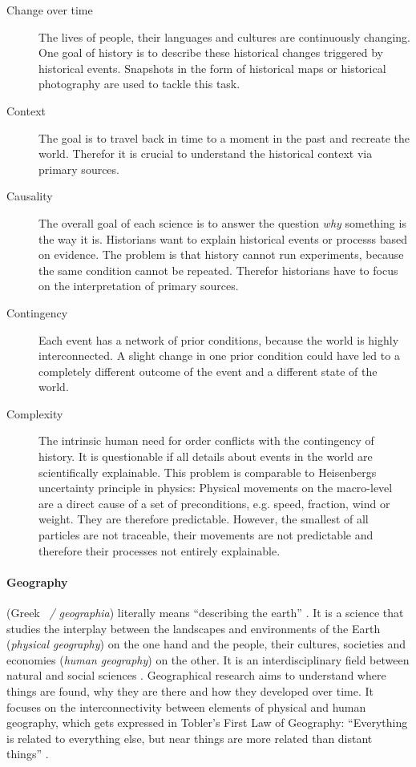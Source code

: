 \vspace{-1em}
\begin{description} %
  \item[Change over time]
  The lives of people, their languages and cultures are continuously changing. One goal of history is to describe these historical changes triggered by historical events. Snapshots in the form of historical maps or historical photography are used to tackle this task.
  \item[Context] The goal is to travel back in time to a moment in the past and recreate the world. Therefor it is crucial to understand the historical context via primary sources.
  \item[Causality]
  The overall goal of each science is to answer the question \emph{why} something is the way it is. Historians want to explain historical events or processs based on evidence. The problem is that history cannot run experiments, because the same condition cannot be repeated. Therefor historians have to focus on the interpretation of primary sources.
  \item[Contingency]
  Each event has a network of prior conditions, because the world is highly interconnected. A slight change in one prior condition could have led to a completely different outcome of the event and a different state of the world.
  \item[Complexity]
  The intrinsic human need for order conflicts with the contingency of history. It is questionable if all details about events in the world are scientifically explainable.
  This problem is comparable to Heisenbergs uncertainty principle in physics: Physical movements on the macro-level are a direct cause of a set of preconditions, e.g. speed, fraction, wind or weight. They are therefore predictable. However, the smallest of all particles are not traceable, their movements are not predictable and therefore their processes not entirely explainable.
\end{description}

\paragraph{Geography} %
\label{par:geography}

(Greek ~\emph{\textgamma\textepsilon\textomega\textgamma\textrho\textalpha\textphi\textiota\textalpha / geographia}) literally means ``describing the earth''
\cite{dict}.
It is a science that studies the interplay between the landscapes and environments of the Earth (\emph{physical geography}) on the one hand and the people, their cultures, societies and economies (\emph{human geography}) on the other. It is an interdisciplinary field between natural and social sciences
\cite{rgsGeography}. Geographical research aims to understand where things are found, why they are there and how they developed over time. It focuses on the interconnectivity between elements of physical and human geography, which gets expressed in Tobler's First Law of Geography: ``Everything is related to everything else, but near things are more related than distant things''
\cite{lawOfGeography}.

